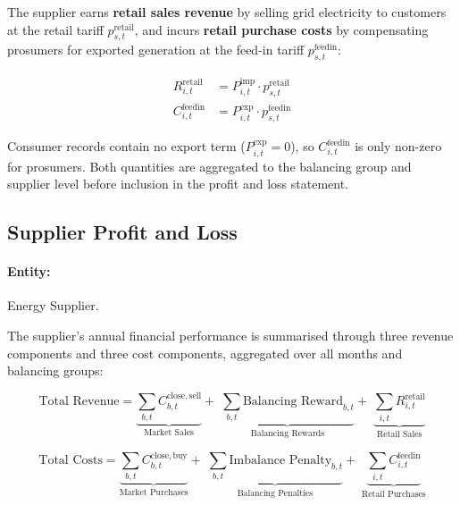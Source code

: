 The supplier earns \textbf{retail sales revenue} by selling grid electricity to customers at the retail tariff $p^{\mathrm{retail}}_{s,t}$, and incurs \textbf{retail purchase costs} by compensating prosumers for exported generation at the feed-in tariff $p^{\mathrm{feedin}}_{s,t}$:

\begin{align}
    R^{\mathrm{retail}}_{i,t} &= P^{\mathrm{imp}}_{i,t} \cdot p^{\mathrm{retail}}_{s,t}
    \label{eq:retail_revenue} \\[4pt]
    C^{\mathrm{feedin}}_{i,t} &= P^{\mathrm{exp}}_{i,t} \cdot p^{\mathrm{feedin}}_{s,t}
    \label{eq:feedin_cost}
\end{align}

Consumer records contain no export term ($P^{\mathrm{exp}}_{i,t} = 0$), so $C^{\mathrm{feedin}}_{i,t}$ is only non-zero for prosumers. Both quantities are aggregated to the balancing group and supplier level before inclusion in the profit and loss statement.

\subsection{Supplier Profit and Loss}
\label{sec:kpi_pnl}

\paragraph{Entity:} Energy Supplier.

The supplier's annual financial performance is summarised through three revenue components and three cost components, aggregated over all months and balancing groups:

\begin{equation}
    \text{Total Revenue} =
        \underbrace{\sum_{b,t} C^{\mathrm{close,sell}}_{b,t}}_{\text{Market Sales}}
        +\; \underbrace{\sum_{b,t} \text{Balancing Reward}_{b,t}}_{\text{Balancing Rewards}}
        +\; \underbrace{\sum_{i,t} R^{\mathrm{retail}}_{i,t}}_{\text{Retail Sales}}
    \label{eq:total_revenue}
\end{equation}

\begin{equation}
    \text{Total Costs} =
        \underbrace{\sum_{b,t} C^{\mathrm{close,buy}}_{b,t}}_{\text{Market Purchases}}
        +\; \underbrace{\sum_{b,t} \text{Imbalance Penalty}_{b,t}}_{\text{Balancing Penalties}}
        +\; \underbrace{\sum_{i,t} C^{\mathrm{feedin}}_{i,t}}_{\text{Retail Purchases}}
    \label{eq:total_costs}
\end{equation}

